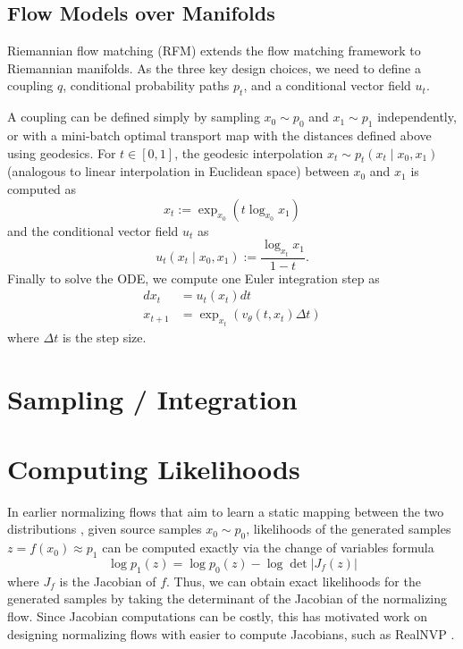 \subsection{Flow Models over Manifolds}

Riemannian flow matching (RFM) \citep{chenRiemannianFlowMatching2023} extends the flow matching framework to Riemannian manifolds. As the three key design choices, we need to define a coupling $q$, conditional probability paths $p_t$, and a conditional vector field $u_t$. 

A coupling can be defined simply by sampling $x_0 \sim p_0$ and $x_1 \sim p_1$ independently, or with a mini-batch optimal transport map with the distances defined above using geodesics. For $t\in [0,1]$, the geodesic interpolation $x_t \sim p_t(x_t \mid x_0, x_1)$ (analogous to linear interpolation in Euclidean space) between $x_0$ and $x_1$ is computed as 
\begin{equation}
    x_t := \exp_{x_0}(t \log_{x_0} x_1)
\end{equation}
and the conditional vector field $u_t$ as
\begin{equation}
    u_t(x_t \mid x_0, x_1) := \frac{\log_{x_t}x_1}{1 - t}.
\end{equation}
Finally to solve the ODE, we compute one Euler integration step as
\begin{align}
    dx_t &= u_t(x_t)dt \\
    x_{t + 1} &= \exp_{x_t}(v_\theta(t, x_t) \Delta t)
\end{align}
where $\Delta t$ is the step size. 


\section{Sampling / Integration} \label{section:sampling_integration}

\section{Computing Likelihoods} \label{section:computing_likelihoods}

In earlier normalizing flows that aim to learn a static mapping between the two distributions \citep{rezendeVariationalInferenceNormalizing2015}, given source samples $x_0 \sim p_0$, likelihoods of the generated samples $z = f(x_0) \approx p_1$  can be computed exactly via the change of variables formula
\begin{equation} \label{eq:static_cov}
    \log p_1(z) = \log p_0(z) - \log \det \left\vert J_f(z) \right\vert
\end{equation}
where $J_f$ is the Jacobian of $f$. Thus, we can obtain exact likelihoods for the generated samples by taking the determinant of the Jacobian of the normalizing flow. Since Jacobian computations can be costly, this has motivated work on designing normalizing flows with easier to compute Jacobians, such as RealNVP \citep{dinhDensityEstimationUsing2017}. 

